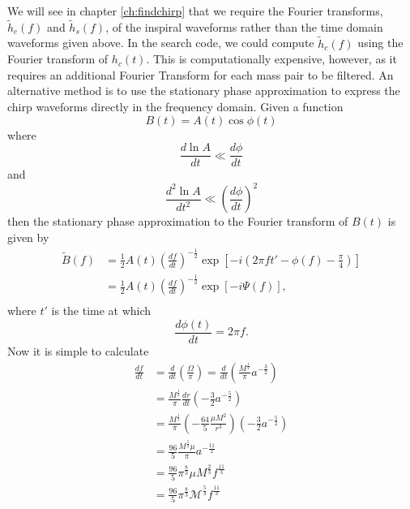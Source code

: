 We will see in chapter \ref{ch:findchirp} that we require the Fourier
transforms, $\tilde{h}_c(f)$ and $\tilde{h}_s(f)$, of the inspiral waveforms
rather than the time domain waveforms given above. In the search code, we
could compute $\tilde{h}_c(f)$ using the Fourier transform of $h_c(t)$.
This is computationally expensive, however, as it requires an additional
Fourier Transform for each mass pair to be filtered. An alternative 
method is to use the stationary phase approximation\cite{Mathews:1992} to
express the chirp waveforms directly in the frequency
domain\cite{WillWiseman:1996,Cutler:1994}. Given a function
\begin{equation}
B(t) = A(t) \cos \phi(t)
\end{equation}
where
\begin{equation}
\frac{d\ln A}{dt} \ll \frac{d\phi}{dt}
\end{equation}
and
\begin{equation}
\frac{d^2\ln A}{dt^2} \ll \left(\frac{d\phi}{dt}\right)^2
\end{equation}
then the stationary phase approximation to the Fourier transform of $B(t)$ is
given by
\begin{equation}
\begin{split}
\tilde{B}(f) &= \frac{1}{2} A(t) \left(\frac{df}{dt}\right)^{-\frac{1}{2}}
\exp\left[ -i \left(2\pi f t' - \phi(f) - \frac{\pi}{4} \right)\right] \\
&= \frac{1}{2} A(t) \left(\frac{df}{dt}\right)^{-\frac{1}{2}}
\exp\left[ -i \Psi(f) \right], \\
\end{split}
\label{eq:spexpression}
\end{equation}
where $t'$ is the time at which
\begin{equation}
\frac{d\phi(t)}{dt} = 2\pi f.
\end{equation}
Now it is simple to calculate
\begin{align}
\label{eq:spdfdt}
\frac{df}{dt} 
     &= \frac{d}{dt} \left(\frac{\Omega}{\pi}\right) 
      = \frac{d}{dt} \left(\frac{M^\frac{1}{2}}{\pi} a^{-\frac{3}{2}}\right) \\
     &= \frac{M^\frac{1}{2}}{\pi} \frac{dr}{dt} \left(-\frac{3}{2} a^{-\frac{5}{2}}\right) \\
     &= \frac{M^\frac{1}{2}}{\pi} \left(-\frac{64}{5} \frac{\mu M^2}{r^3}\right)
        \left(-\frac{3}{2} a^{-\frac{5}{2}}\right) \\
     &= \frac{96}{5} \frac{M^\frac{5}{2} \mu}{\pi} a^{-\frac{11}{2}} \\
&= \frac{96}{5} \pi^\frac{8}{3} \mu M^\frac{2}{3} f^\frac{11}{3} \\
&= \frac{96}{5} \pi^\frac{8}{3} \mathcal{M}^\frac{5}{3} f^\frac{11}{3}
\end{align}
